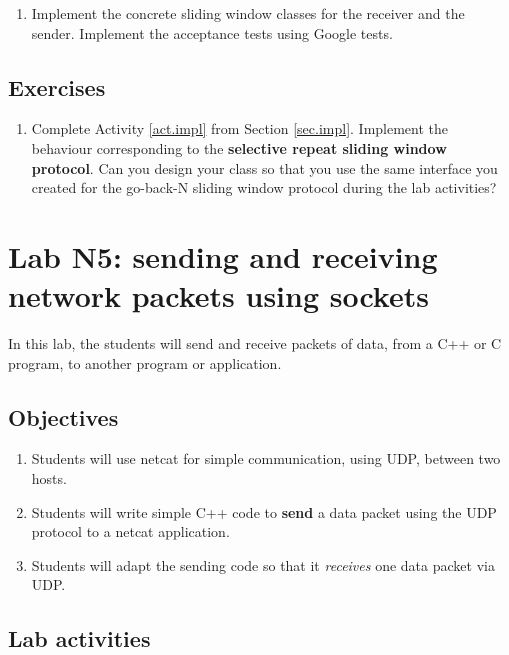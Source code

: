 \documentclass[12pt]{book}
\begin{document}
\begin{enumerate}[resume*]
\item\label{act.impl} Implement the concrete sliding window classes for the receiver and the sender. Implement the acceptance tests using Google tests. 
\end{enumerate}

\section{Exercises}

\begin{enumerate}[label=\arabic*.]
\item Complete Activity \ref{act.impl} from Section \ref{sec.impl}. Implement the behaviour corresponding to the \textbf{selective repeat sliding window protocol}. Can you design your class so that you use the same interface you created for the go-back-N sliding window protocol during the lab activities? 
\end{enumerate}



\chapter{Lab N5: sending and receiving network packets using sockets}

In this lab, the students will send and receive packets of data, from a C++ or C program, to another program or application.

\section{Objectives}

\begin{enumerate}[label=Objective \arabic*]
\item\label{pl4.nc} Students will use netcat for simple communication, using UDP, between two hosts.
\item\label{pl4.send} Students will write simple C++ code to \textbf{send} a data packet using the UDP protocol to a netcat application.
  \item\label{pl4.recv} Students will adapt the sending code so that it \emph{receives} one data packet via UDP.
\end{enumerate}


\section{Lab activities}
\end{document}
